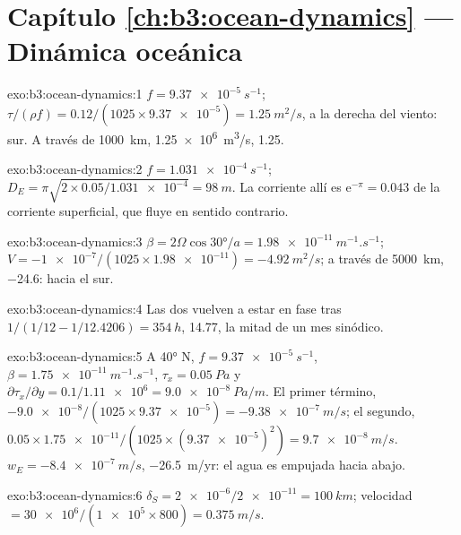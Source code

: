 \section*{Capítulo \ref{ch:b3:ocean-dynamics} --- Dinámica oceánica}

\begin{solution}{exo:b3:ocean-dynamics:1}
$f = \qty{9.37e-5}{s^{-1}}$; $\tau/(\rho f) = 0.12/(1025\times\num{9.37e-5})
= \qty{1.25}{m^2/s}$, a la derecha del viento: sur. A través de
\qty{1000}{km}, \qty{1.25e6}{m^3/s}, \qty{1.25}{\sverdrup}.
\end{solution}

\begin{solution}{exo:b3:ocean-dynamics:2}
$f = \qty{1.031e-4}{s^{-1}}$; $D_E = \pi\sqrt{2\times0.05/\num{1.031e-4}}
= \qty{98}{m}$. La corriente allí es $\mathrm e^{-\pi} = \num{0.043}$ de la
corriente superficial, que fluye en sentido contrario.
\end{solution}

\begin{solution}{exo:b3:ocean-dynamics:3}
$\beta = 2\Omega\cos\ang{30}/a = \qty{1.98e-11}{m^{-1}.s^{-1}}$; $V =
\num{-1e-7}/(1025\times\num{1.98e-11}) = \qty{-4.92}{m^2/s}$; a través de
\qty{5000}{km}, \qty{-24.6}{\sverdrup}: hacia el sur.
\end{solution}

\begin{solution}{exo:b3:ocean-dynamics:4}
Las dos  vuelven a estar en fase tras $1/(1/12 - 1/12.4206) =
\qty{354}{h}$, \num{14.77}, la mitad de un mes sinódico.
\end{solution}

\begin{solution}{exo:b3:ocean-dynamics:5}
A \ang{40} N, $f = \qty{9.37e-5}{s^{-1}}$, $\beta =
\qty{1.75e-11}{m^{-1}.s^{-1}}$, $\tau_x = \qty{0.05}{Pa}$ y
$\partial\tau_x/\partial y = 0.1/\num{1.11e6} = \qty{9.0e-8}{Pa/m}$. El
primer término, $-\num{9.0e-8}/(1025\times\num{9.37e-5}) =
\qty{-9.38e-7}{m/s}$; el segundo, $0.05\times\num{1.75e-11}/(1025\times
(\num{9.37e-5})^2) = \qty{+9.7e-8}{m/s}$. $w_E = \qty{-8.4e-7}{m/s}$,
\qty{-26.5}{m/yr}: el agua es empujada hacia abajo.
\end{solution}

\begin{solution}{exo:b3:ocean-dynamics:6}
$\delta_S = \num{2e-6}/\num{2e-11} = \qty{100}{km}$; velocidad $=
\num{30e6}/(\num{1e5}\times800) = \qty{0.375}{m/s}$.
\end{solution}

